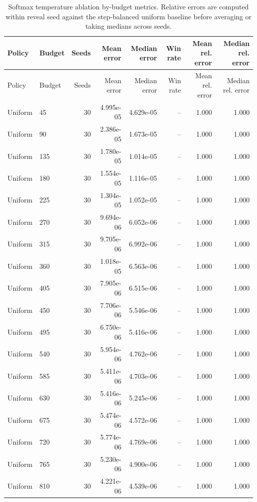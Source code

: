 \begin{scriptsize}
\begin{longtable}{llrrrrrr}
\caption{Softmax temperature ablation by-budget metrics. Relative errors are computed within reveal seed against the step-balanced uniform baseline before averaging or taking medians across seeds.}\label{tab:softmax-temperature-ablation-by-budget-metrics}\\
\toprule
Policy & Budget & Seeds & Mean error & Median error & Win rate & Mean rel. error & Median rel. error \\
\midrule
\endfirsthead
\toprule
Policy & Budget & Seeds & Mean error & Median error & Win rate & Mean rel. error & Median rel. error \\
\midrule
\endhead
Uniform & 45 & 30 & 4.995e-05 & 4.629e-05 & -- & 1.000 & 1.000 \\
Uniform & 90 & 30 & 2.386e-05 & 1.673e-05 & -- & 1.000 & 1.000 \\
Uniform & 135 & 30 & 1.780e-05 & 1.014e-05 & -- & 1.000 & 1.000 \\
Uniform & 180 & 30 & 1.554e-05 & 1.116e-05 & -- & 1.000 & 1.000 \\
Uniform & 225 & 30 & 1.304e-05 & 1.052e-05 & -- & 1.000 & 1.000 \\
Uniform & 270 & 30 & 9.694e-06 & 6.052e-06 & -- & 1.000 & 1.000 \\
Uniform & 315 & 30 & 9.705e-06 & 6.992e-06 & -- & 1.000 & 1.000 \\
Uniform & 360 & 30 & 1.018e-05 & 6.563e-06 & -- & 1.000 & 1.000 \\
Uniform & 405 & 30 & 7.905e-06 & 6.515e-06 & -- & 1.000 & 1.000 \\
Uniform & 450 & 30 & 7.706e-06 & 5.546e-06 & -- & 1.000 & 1.000 \\
Uniform & 495 & 30 & 6.750e-06 & 5.416e-06 & -- & 1.000 & 1.000 \\
Uniform & 540 & 30 & 5.954e-06 & 4.762e-06 & -- & 1.000 & 1.000 \\
Uniform & 585 & 30 & 5.411e-06 & 4.703e-06 & -- & 1.000 & 1.000 \\
Uniform & 630 & 30 & 5.416e-06 & 5.245e-06 & -- & 1.000 & 1.000 \\
Uniform & 675 & 30 & 5.474e-06 & 4.572e-06 & -- & 1.000 & 1.000 \\
Uniform & 720 & 30 & 5.774e-06 & 4.769e-06 & -- & 1.000 & 1.000 \\
Uniform & 765 & 30 & 5.230e-06 & 4.900e-06 & -- & 1.000 & 1.000 \\
Uniform & 810 & 30 & 4.221e-06 & 4.539e-06 & -- & 1.000 & 1.000 \\

\end{longtable}
\end{scriptsize}
